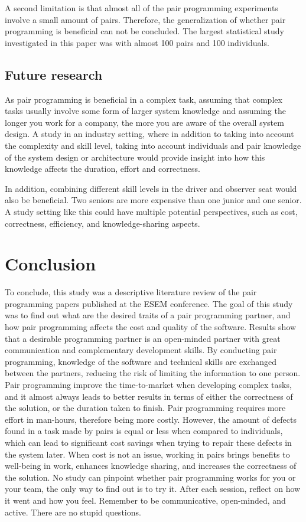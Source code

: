 \documentclass[conference]{IEEEtran}
\begin{document}
A second limitation is that almost all of the pair programming experiments involve a small amount of pairs. Therefore, the generalization of whether pair programming is beneficial can not be concluded. The largest statistical study investigated in this paper was \cite{Arisholm2007Evaluating} with almost 100 pairs and 100 individuals.


\subsection{Future research}

As pair programming is beneficial in a complex task, assuming that complex tasks usually involve some form of larger system knowledge and assuming the longer you work for a company, the more you are aware of the overall system design. A study in an industry setting, where in addition to taking into account the complexity and skill level, taking into account individuals and pair knowledge of the system design or architecture would provide insight into how this knowledge affects the duration, effort and correctness.

In addition, combining different skill levels in the driver and observer seat would also be beneficial. Two seniors are more expensive than one junior and one senior. A study setting like this could have multiple potential perspectives, such as cost, correctness, efficiency, and knowledge-sharing aspects.

\section{Conclusion}

To conclude, this study was a descriptive literature review of the pair programming papers published at the ESEM conference. The goal of this study was to find out what are the desired traits of a pair programming partner, and how pair programming affects the cost and quality of the software. Results show that a desirable programming partner is an open-minded partner with great communication and complementary development skills. By conducting pair programming, knowledge of the software and technical skills are exchanged between the partners, reducing the risk of limiting the information to one person. Pair programming improve the time-to-market when developing complex tasks, and it almost always leads to better results in terms of either the correctness of the solution, or the duration taken to finish. Pair programming requires more effort in man-hours, therefore being more costly. However, the amount of defects found in a task made by pairs is equal or less when compared to individuals, which can lead to significant cost savings when trying to repair these defects in the system later. When cost is not an issue, working in pairs brings benefits to well-being in work, enhances knowledge sharing, and increases the correctness of the solution. No study can pinpoint whether pair programming works for you or your team, the only way to find out is to try it. After each session, reflect on how it went and how you feel. Remember to be communicative, open-minded, and active. There are no stupid questions.





\end{document}
